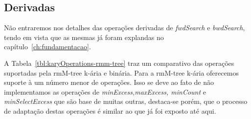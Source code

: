      \subsection{Derivadas}
     Não entraremos nos detalhes das operações derivadas de \textit{fwdSearch} e \textit{bwdSearch}, tendo em vista que as mesmas já foram explandas no capítulo~\ref{ch:fundamentacao}.  
     
     A Tabela~\ref{tbl:karyOperations-rmm-tree} traz um comparativo das operações suportadas pela rmM-tree k-ária e binária. Para a rmM-tree k-ária oferecemos suporte à um número menor de operações. Isso se deve ao fato de não implementamos as operações de \textit{minExcess,maxExcess, minCount} e \textit{minSelectExcess} que são base de muitas outras, destaca-se porém, que o processo de adaptação destas operações é similar ao que já foi exposto até aqui.

     




